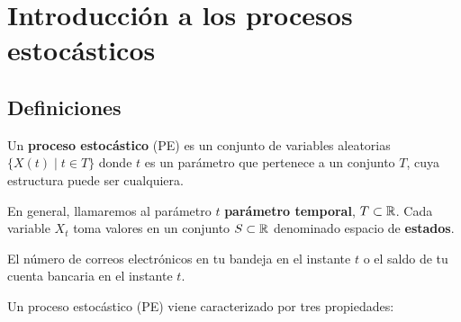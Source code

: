 \documentclass[PREyA.tex]{subfiles}
\begin{document}
\chapter{Introducción a los procesos estocásticos}
\section{Definiciones}
\begin{defi}
Un \textbf{proceso estocástico} (PE) es un conjunto de variables aleatorias $\{X(t) \mid t  \in T\}$ donde $t$ es un parámetro que pertenece a un conjunto $T$, cuya estructura puede ser cualquiera.
\end{defi}
\begin{nota}
En general, llamaremos al parámetro $t$ \textbf{parámetro temporal}, $T\subset \mathbb{R}$. Cada variable $X_t$ toma valores en un conjunto $S\subset \mathbb{R}$ denominado espacio de \textbf{estados}.
\end{nota}
\begin{example}
El número de correos electrónicos en tu bandeja en el instante $t$ o el saldo de tu cuenta bancaria en el instante $t$.
\end{example}

Un proceso estocástico (PE) viene caracterizado por tres propiedades:
\end{document}

